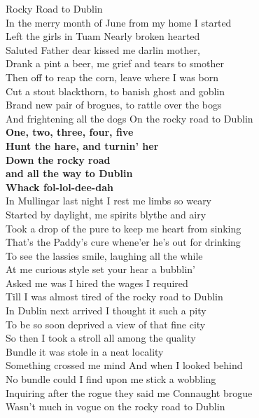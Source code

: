 \documentclass[letterpaper,9pt]{article}
\begin{document}
\newpage
{}
\Huge
Rocky Road to Dublin\\

\LARGE
In the merry month of June from my home I started \\
Left the girls in Tuam Nearly broken hearted \\
Saluted Father dear kissed me darlin mother, \\
Drank a pint a beer, me grief and tears to smother \\
Then off to reap the corn, leave where I was born \\
Cut a stout blackthorn, to banish ghost and goblin \\
Brand new pair of brogues, to rattle over the bogs \\
And frightening all the dogs On the rocky road to Dublin \\
\textbf{One, two, three, four, five \\
Hunt the hare, and turnin' her \\
Down the rocky road \\
and all the way to Dublin \\
Whack fol-lol-dee-dah} \\

In Mullingar last night I rest me limbs so weary \\
Started by daylight, me spirits blythe and airy \\
Took a drop of the pure to keep me heart from sinking \\
That's the Paddy's cure whene'er he's out for drinking \\
To see the lassies smile, laughing all the while \\
At me curious style set your hear a bubblin' \\
Asked me was I hired the wages I required \\
Till I was almost tired of the rocky road to Dublin \\

\newpage
In Dublin next arrived I thought it such a pity \\
To be so soon deprived a view of that fine city \\
So then I took a stroll all among the quality \\
Bundle it was stole in a neat locality \\
Something crossed me mind And when I looked behind \\
No bundle could I find upon me stick a wobbling \\
Inquiring after the rogue they said me Connaught brogue \\
Wasn't much in vogue on the rocky road to Dublin \\
\end{document}
